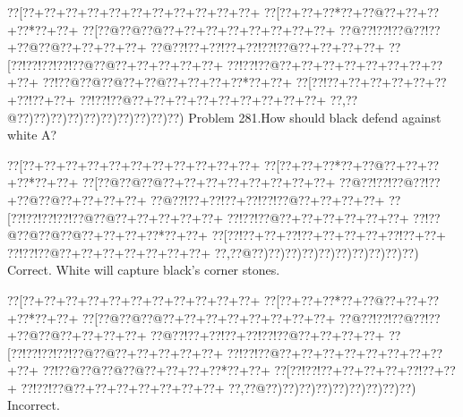 \documentclass[a5paper]{article}
\begin{document}
\newpage
\begin{center}
{\goo
\0??[\0??+\0??+\0??+\0??+\0??+\0??+\0??+\0??+\0??+\0??+\0??+
\0??[\0??+\0??+\0??*\0??+\0??@\0??+\0??+\0??+\0??*\0??+\0??+
\0??[\0??@\0??@\0??@\0??+\0??+\0??+\0??+\0??+\0??+\0??+\0??+
\0??@\0??!\0??!\0??@\0??!\0??+\0??@\0??@\0??+\0??+\0??+\0??+
\0??@\0??!\0??+\0??!\0??+\0??!\0??!\0??@\0??+\0??+\0??+\0??+
\0??[\0??!\0??!\0??!\0??!\0??@\0??@\0??+\0??+\0??+\0??+\0??+
\0??!\0??!\0??@\0??+\0??+\0??+\0??+\0??+\0??+\0??+\0??+\0??+
\0??!\0??@\0??@\0??@\0??+\0??@\0??+\0??+\0??+\0??*\0??+\0??+
\0??[\0??!\0??+\0??+\0??+\0??+\0??+\0??+\0??!\0??+\0??+
\0??!\0??!\0??@\0??+\0??+\0??+\0??+\0??+\0??+\0??+\0??+\0??+
\0??,\0??@\0??)\0??)\0??)\0??)\0??)\0??)\0??)\0??)\0??)\0??)
}
Problem 281.How should black defend against white A?

\end{center}
\begin{center}
{\goo
\0??[\0??+\0??+\0??+\0??+\0??+\0??+\0??+\0??+\0??+\0??+\0??+
\0??[\0??+\0??+\0??*\0??+\0??@\0??+\0??+\0??+\0??*\0??+\0??+
\0??[\0??@\0??@\0??@\0??+\0??+\0??+\0??+\0??+\0??+\0??+\0??+
\0??@\0??!\0??!\0??@\0??!\0??+\0??@\0??@\0??+\0??+\0??+\0??+
\0??@\0??!\0??+\0??!\0??+\0??!\0??!\0??@\0??+\0??+\0??+\0??+
\0??[\0??!\0??!\0??!\0??!\0??@\0??@\0??+\0??+\0??+\0??+\0??+
\0??!\0??!\0??@\0??+\0??+\0??+\0??+\0??+\0??+
\0??!\0??@\0??@\0??@\0??@\0??+\0??+\0??+\0??*\0??+\0??+
\0??[\0??!\0??+\0??+\0??!\0??+\0??+\0??+\0??+\0??!\0??+\0??+
\0??!\0??!\0??@\0??+\0??+\0??+\0??+\0??+\0??+\0??+
\0??,\0??@\0??)\0??)\0??)\0??)\0??)\0??)\0??)\0??)\0??)\0??)
}
Correct. White will capture black's corner stones.

\end{center}
\begin{center}
{\goo
\0??[\0??+\0??+\0??+\0??+\0??+\0??+\0??+\0??+\0??+\0??+\0??+
\0??[\0??+\0??+\0??*\0??+\0??@\0??+\0??+\0??+\0??*\0??+\0??+
\0??[\0??@\0??@\0??@\0??+\0??+\0??+\0??+\0??+\0??+\0??+\0??+
\0??@\0??!\0??!\0??@\0??!\0??+\0??@\0??@\0??+\0??+\0??+\0??+
\0??@\0??!\0??+\0??!\0??+\0??!\0??!\0??@\0??+\0??+\0??+\0??+
\0??[\0??!\0??!\0??!\0??!\0??@\0??@\0??+\0??+\0??+\0??+\0??+
\0??!\0??!\0??@\0??+\0??+\0??+\0??+\0??+\0??+\0??+\0??+\0??+
\0??!\0??@\0??@\0??@\0??@\0??+\0??+\0??+\0??*\0??+\0??+
\0??[\0??!\0??!\0??+\0??+\0??+\0??+\0??!\0??+\0??+
\0??!\0??!\0??@\0??+\0??+\0??+\0??+\0??+\0??+\0??+
\0??,\0??@\0??)\0??)\0??)\0??)\0??)\0??)\0??)\0??)\0??)
}
Incorrect. 

\end{center}
\end{document}
